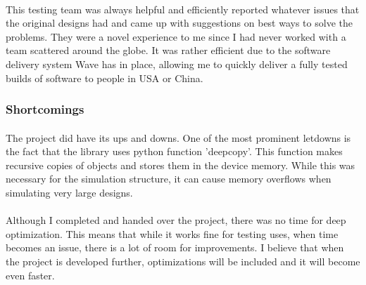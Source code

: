 \paragraph{}
This testing team was always helpful and efficiently reported whatever issues that the original designs had and came up with suggestions on best ways to solve the problems. They were a novel experience to me since I had never worked with a team scattered around the globe. It was rather efficient due to the software delivery system Wave has in place, allowing me to quickly deliver a fully tested builds of software to people in USA or China.

\subsubsection{Shortcomings}
\paragraph{}
The project did have its ups and downs. One of the most prominent letdowns is the fact that the library uses python function 'deepcopy'. This function makes recursive copies of objects and stores them in the device memory. While this was necessary for the simulation structure, it can cause memory overflows when simulating very large designs.

\paragraph{}
Although I completed and handed over the project, there was no time for deep optimization. This means that while it works fine for testing uses, when time becomes an issue, there is a lot of room for improvements. I believe that when the project is developed further, optimizations will be included and it will become even faster.